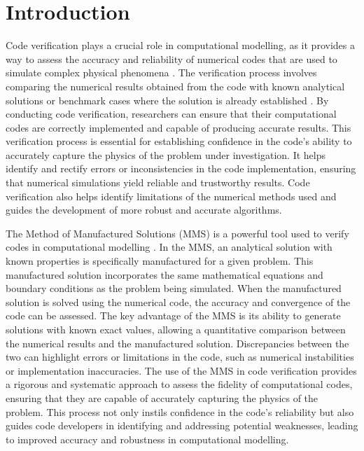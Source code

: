 \documentclass[preprint, 12pt]{elsarticle}
\begin{document}
\section{Introduction}
\label{sec:Introduction}

Code verification plays a crucial role in computational modelling, as it
provides a way to assess the accuracy and reliability of numerical codes that
are used to simulate complex physical phenomena \cite{Khoshghalb2019,
Tranquilli2022}. The verification process involves comparing the numerical
results obtained from the code with known analytical solutions or benchmark
cases where the solution is already established \cite{Fernandes2018,
Pedro2020}. By conducting code verification, researchers can ensure that their
computational codes are correctly implemented and capable of producing accurate
results. This verification process is essential for establishing confidence in
the code's ability to accurately capture the physics of the problem under
investigation. It helps identify and rectify errors or inconsistencies in the
code implementation, ensuring that numerical simulations yield reliable and
trustworthy results. Code verification also helps identify limitations of the
numerical methods used and guides the development of more robust and accurate
algorithms. 

The Method of Manufactured Solutions (MMS) is a powerful tool used to verify
codes in computational modelling \cite{Roy2004, Habla2016, Muralha2020,
Freno2021}. In the MMS, an analytical solution with known properties is
specifically manufactured for a given problem. This manufactured solution
incorporates the same mathematical equations and boundary conditions as the
problem being simulated. When the manufactured solution is solved using the
numerical code, the accuracy and convergence of the code can be assessed. The
key advantage of the MMS is its ability to generate solutions with known exact
values, allowing a quantitative comparison between the numerical results and
the manufactured solution. Discrepancies between the two can highlight errors
or limitations in the code, such as numerical instabilities or implementation
inaccuracies. The use of the MMS in code verification provides a rigorous and
systematic approach to assess the fidelity of computational codes, ensuring
that they are capable of accurately capturing the physics of the problem. This
process not only instils confidence in the code's reliability but also guides
code developers in identifying and addressing potential weaknesses, leading to
improved accuracy and robustness in computational modelling.
\end{document}
